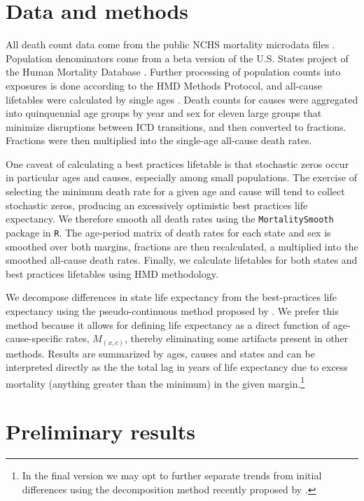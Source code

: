 \documentclass[11pt,oneside,a4paper]{article} %
\begin{document}
\section*{Data and methods}
All death count data come from the public NCHS mortality microdata files
\citep{NCHSdata}. Population denominators come from a beta version of the U.S.
States project of the Human Mortality Database \citep{HMD}. Further processing of
population counts into exposures is done according to the HMD Methods
Protocol, and all-cause lifetables were calculated by single ages \citep{HMDMP}.
Death counts for causes were aggregated into quinquennial age groups by year and sex for eleven large groups that minimize disruptions between ICD transitions, and then
converted to fractions. Fractions were then multiplied into the single-age
all-cause death rates.

One caveat of calculating a best practices lifetable is that stochastic zeros
occur in particular ages and causes, especially among small populations. The
exercise of selecting the minimum death rate for a given age and cause will tend
to collect stochastic zeros, producing an excessively optimistic best practices
life expectancy. We therefore smooth all death rates using
the \texttt{MortalitySmooth} package \citep{GC2012} in \texttt{R}. The age-period
matrix of death rates for each state and sex is smoothed over both margins,
fractions are then recalculated, a multiplied into the smoothed all-cause death
rates. Finally, we calculate lifetables for both states and best practices
lifetables using HMD methodology.

We decompose differences in state life expectancy from the best-practices life
expectancy using the pseudo-continuous method proposed by
\citet{horiuchi2008decomposition}. We prefer this method because it allows for
defining life expectancy as a direct function of age-cause-specific rates,
$M_{(x,c)}$, thereby eliminating some artifacts present in other methods.
Results are summarized by ages, causes and states and can be interpreted
directly as the the total lag in years of life expectancy due to excess
mortality (anything greater than the minimum) in the given margin.\footnote{In
the final version we may opt to further separate trends from initial
differences using the decomposition method recently proposed by
\citet{DimaDecomp2014}.}

\FloatBarrier
\section*{Preliminary results}
\FloatBarrier
\end{document}
